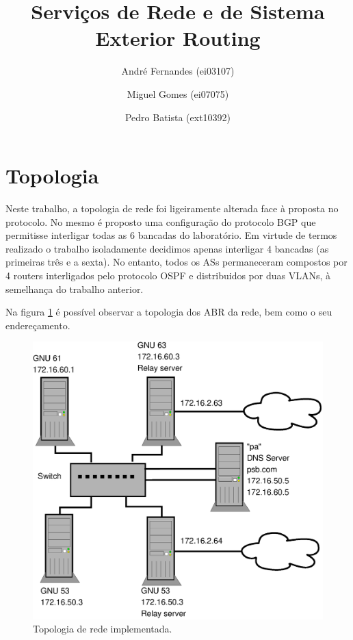 \documentclass[a4paper,12pt]{article}
\title{Serviços de Rede e de Sistema \\
Exterior Routing }
\author{André Fernandes (ei03107) \and Miguel Gomes (ei07075) \and Pedro Batista (ext10392)}
\begin{document}
\maketitle

\section{Topologia}

Neste trabalho, a topologia de rede foi ligeiramente alterada face à 
proposta no protocolo. No mesmo é proposto uma configuração do protocolo BGP 
que permitisse interligar todas as 6 bancadas do laboratório. 
Em virtude de termos realizado o trabalho isoladamente decidimos apenas 
interligar 4 bancadas (as primeiras três e a sexta).
No entanto, todos os ASs permaneceram compostos por 4 routers interligados pelo 
protocolo OSPF e distribuidos por duas VLANs, à semelhança do trabalho anterior. 

Na figura \ref{fig:topologia} é possível observar a topologia dos ABR da rede,
bem como o seu endereçamento.

\begin{figure}[htp]
	\begin{center}
		\includegraphics[width=6in]{topologia}
	\end{center}
	\caption{Topologia de rede implementada.}
	\label{fig:topologia}
\end{figure}
\end{document}

